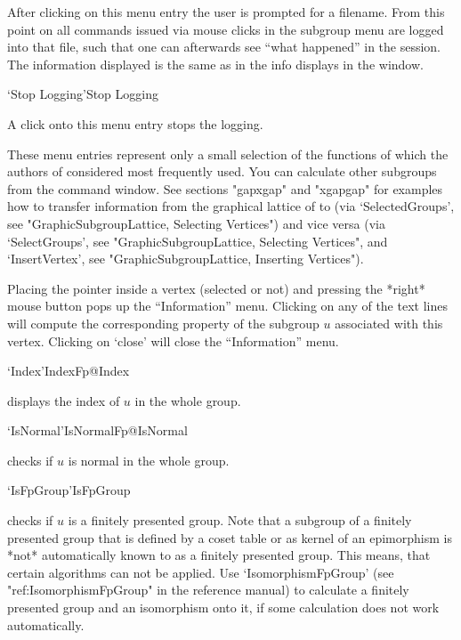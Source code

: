 After clicking on this menu entry the user is prompted for a filename. From 
this point on all commands issued via mouse clicks in the subgroup menu are 
logged into that file, such that one can afterwards see ``what happened''
in the {\XGAP} session. The information displayed is the same as in the
info displays in the {\GAP} window. 

\>`Stop Logging'{Stop Logging}

A click onto this menu entry stops the {\XGAP} logging.

\bigskip

These menu entries represent only a small selection of the functions of
{\GAP} which the authors of {\XGAP} considered most frequently used. You
can calculate other subgroups from
the {\GAP} command window. See sections "gapxgap" and
"xgapgap" for examples how to transfer information from the graphical
lattice of {\XGAP} to {\GAP} (via `SelectedGroups', see
"GraphicSubgroupLattice, Selecting Vertices") and vice versa (via
`SelectGroups', see "GraphicSubgroupLattice, Selecting Vertices", and
`InsertVertex', see "GraphicSubgroupLattice, Inserting Vertices").



Placing the pointer  inside a vertex (selected  or not) and  pressing the
*right* mouse button pops up the ``Information''  menu.  Clicking on any of
the text  lines will compute the corresponding   property of the subgroup
$u$  associated  with this  vertex. Clicking  on `close'  will  close the
``Information'' menu.

\>`Index'{IndexFp}@{Index}

displays  the index of  $u$ in the whole  group.

\>`IsNormal'{IsNormalFp}@{IsNormal}

checks  if $u$ is  normal  in the  whole group.

\>`IsFpGroup'{IsFpGroup}

checks if $u$ is a finitely presented group. Note that a subgroup of a
finitely presented group that is defined by a coset table or as kernel
of an epimorphism is *not* automatically known to {\GAP} as a finitely
presented group. This means, that certain algorithms can not be
applied. Use `IsomorphismFpGroup' (see "ref:IsomorphismFpGroup" in the
{\GAP} reference manual) to calculate a finitely presented group and
an isomorphism onto it, if some calculation does not work automatically.

